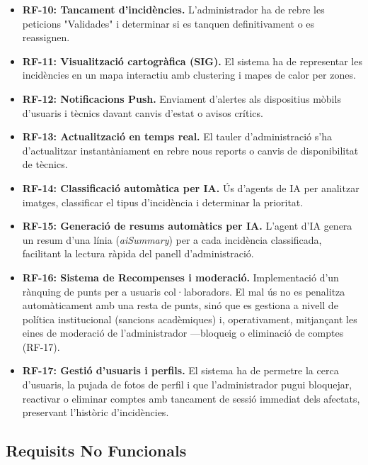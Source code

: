 \documentclass[10pt,a4paper,twocolumn,twoside]{article}
\begin{document}
\begin{itemize}
			\item \textbf{RF-10: Tancament d'incidències.} 
			L'administrador ha de rebre les peticions  "Validades" i determinar si es tanquen definitivament o es reassignen. 
			
			\item \textbf{RF-11: Visualització cartogràfica (SIG).} 
			El sistema ha de representar les incidències en un mapa interactiu amb clustering i mapes de calor per zones.
			
			\item \textbf{RF-12: Notificacions Push. }
			Enviament d'alertes als dispositius mòbils d'usuaris i tècnics davant canvis d'estat o avisos crítics. 
			
			\item \textbf{RF-13: Actualització en temps real.} 
			El tauler d'administració s'ha d'actualitzar instantàniament en rebre nous reports o canvis de disponibilitat de tècnics. 
			
			\item \textbf{RF-14: Classificació automàtica per IA. }
			Ús d'agents de IA per analitzar imatges, classificar el tipus d'incidència i determinar la prioritat. 
			
			\item \textbf{RF-15: Generació de resums automàtics per IA.}
			L'agent d'IA genera un resum d'una línia (\textit{aiSummary}) per a cada incidència classificada, facilitant la lectura ràpida del panell d'administració.
			
			\item \textbf{RF-16: Sistema de Recompenses i moderació. }
			Implementació d'un rànquing de punts per a usuaris col·laboradors. El mal ús no es penalitza automàticament amb una resta de punts, sinó que es gestiona a nivell de política institucional (sancions acadèmiques) i, operativament, mitjançant les eines de moderació de l'administrador —bloqueig o eliminació de comptes (RF-17).
			
			\item \textbf{RF-17: Gestió d'usuaris i perfils. }
			El sistema ha de permetre la cerca d'usuaris, la pujada de fotos de perfil i que l'administrador pugui bloquejar, reactivar o eliminar comptes amb tancament de sessió immediat dels afectats, preservant l'històric d'incidències.
			
		\end{itemize}
		
		\subsection{Requisits No Funcionals}
		
\end{document}

